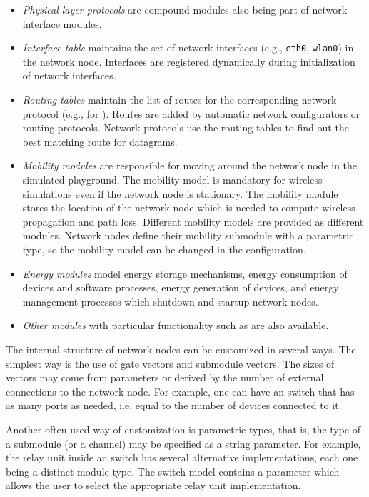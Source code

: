 \begin{itemize}
        \item \emph{Physical layer protocols} are compound modules also being part of network interface modules.
        \item \emph{Interface table} maintains the set of network interfaces (e.g., \texttt{eth0}, \texttt{wlan0}) in the network node. Interfaces are registered dynamically during initialization of network interfaces.
        \item \emph{Routing tables} maintain the list of routes for the corresponding network protocol (e.g.,  for ). Routes are added by automatic network configurators or routing protocols. Network protocols use the routing tables to find out the best matching route for datagrams.
        \item \emph{Mobility modules} are responsible for moving around the network node in the simulated playground. The mobility model is mandatory for wireless simulations even if the network node is stationary. The mobility module stores the location of the network node which is needed to compute wireless propagation and path loss. Different mobility models are provided as different modules. Network nodes define their mobility submodule with a parametric type, so the mobility model can be changed in the configuration.
        \item \emph{Energy modules} model energy storage mechanisms, energy consumption of devices and software processes, energy generation of devices, and energy management processes which shutdown and startup network nodes.
        \item \emph{Other modules} with particular functionality such as  are also available.
\end{itemize}

The internal structure of network nodes can be customized in several ways. The simplest way is the use of gate vectors and submodule vectors. The sizes of vectors may come from parameters or derived by the number of external connections to the network node. For example, one can have an  switch that has as many ports as needed, i.e. equal to the number of  devices connected to it.

Another often used way of customization is parametric types, that is, the type of a submodule (or a channel) may be specified as a string parameter. For example, the relay unit inside an  switch has several alternative implementations, each one being a distinct module type. The switch model contains a parameter which allows the user to select the appropriate relay unit implementation.

